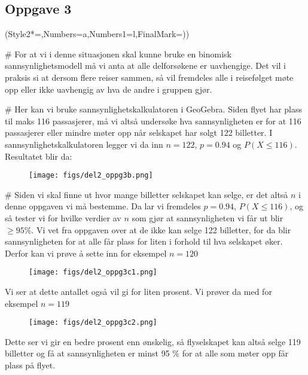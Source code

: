 \subsection*{Oppgave 3}
\begin{easylist}[enumerate]
	\ListProperties(Style2*=,Numbers=a,Numbers1=l,FinalMark={)})
	
	# For at vi i denne situasjonen skal kunne bruke en binomisk sannsynlighetsmodell må vi anta at alle delforsøkene er uavhengige. Det vil i praksis si at dersom flere reiser sammen, så vil fremdeles alle i reisefølget møte opp eller ikke uavhengig av hva de andre i gruppen gjør.
	
	# Her kan vi bruke sannsynlighetskalkulatoren i GeoGebra. Siden flyet har plass til maks 116 passasjerer, må vi altså undersøke hva sannsynligheten er for at 116 passasjerer eller mindre møter opp når selskapet har solgt 122 billetter. I sannsynlighetskalkulatoren legger vi da inn $n = 122$, $p = 0.94$ og $P(X \leq 116)$. Resultatet blir da:
	
	\begin{figure}[ht!]
		\centering
		\texttt{[image: figs/del2\_oppg3b.png]}
		\label{fig:del2_oppg3b}
	\end{figure}
	

	# Siden vi skal finne ut hvor mange billetter selskapet kan selge, er det altså $n$ i denne oppgaven vi må bestemme. Da lar vi fremdeles $p = 0.94$, $P(X \leq 116)$, og så tester vi for hvilke verdier av $n$ som gjør at sannsynligheten vi får ut blir $\geq 95\% $. Vi vet fra oppgaven over at de ikke kan selge 122 billetter, for da blir sannsynligheten for at alle får plass for liten i forhold til hva selskapet øker. Derfor kan vi prøve å sette inn for eksempel $n = 120$
	
	
	
	\begin{figure}[h]
		\centering
		\texttt{[image: figs/del2\_oppg3c1.png]}
	\end{figure}
	
	\newpage
	Vi ser at dette antallet også vil gi for liten prosent. Vi prøver da med for eksempel $n = 119$
	
	\begin{figure}[ht!]
		\centering
		\texttt{[image: figs/del2\_oppg3c2.png]}
	\end{figure}
	
	Dette ser vi gir en bedre prosent enn ønskelig, så flyselskapet kan altså selge 119 billetter og få at sannsynligheten er minst 95 \% for at alle som møter opp får plass på flyet.	
	
	
\end{easylist}

